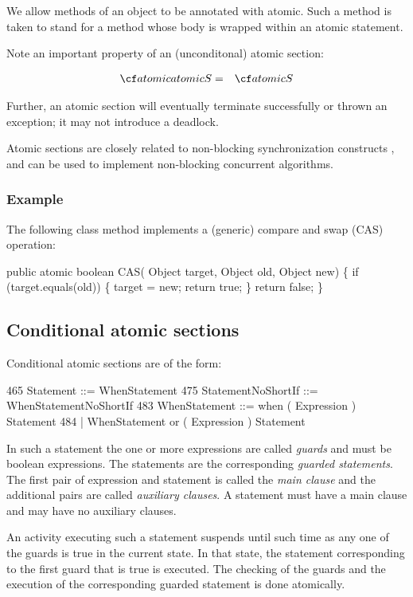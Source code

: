 {{We allow methods of an object to be annotated with {\cf atomic}. Such
a method is taken to stand for a method whose body is wrapped within an
{\cf atomic} statement.

Note an important property of an (unconditonal) atomic section:

\begin{eqnarray}
 {\cf atomic atomic} S &=& {\cf atomic} S
\end{eqnarray}

Further, an atomic section will eventually terminate successfully or
thrown an exception; it may not introduce a deadlock.

Atomic sections are closely related to non-blocking synchronization
constructs \cite{Herlihy-non-block}, and can be used to implement 
non-blocking concurrent algorithms.

\subsubsection{Example}

The following class method implements a (generic) compare and swap (CAS) operation:
\begin{x10}
public atomic boolean CAS( Object target, 
                           Object old, 
                           Object new) \{
   if (target.equals(old)) \{
     target = new;
     return true;
   \}
   return false;
\}
\end{x10}

\subsection{Conditional atomic sections}

Conditional atomic sections are of the form:
\begin{x10}
465 Statement ::= WhenStatement
475 StatementNoShortIf ::= WhenStatementNoShortIf
483 WhenStatement ::= when ( Expression ) Statement
484     | WhenStatement or ( Expression ) Statement
\end{x10}

In such a statement the one or more expressions are called {\em
guards} and must be {\cf boolean} expressions. The statements are the
corresponding {\em guarded statements}. The first pair of expression
and statement is called the {\em main clause} and the additional pairs
are called {\em auxiliary clauses}. A statement must have a main
clause and may have no auxiliary clauses.

An activity executing such a statement suspends until such time as any
one of the guards is true in the current state. In that state, the
statement corresponding to the first guard that is true is executed.
The checking of the guards and the execution of the corresponding
guarded statement is done atomically. 

}}
